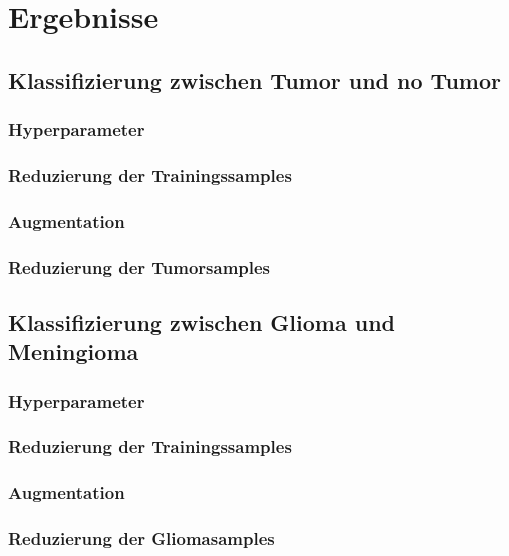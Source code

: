 \chapter{Ergebnisse}

\section{Klassifizierung zwischen Tumor und no Tumor}

\subsection{Hyperparameter}
\subsection{Reduzierung der Trainingssamples}
\subsection{Augmentation}
\subsection{Reduzierung der Tumorsamples}

\section{Klassifizierung zwischen Glioma und Meningioma}

\subsection{Hyperparameter}
\subsection{Reduzierung der Trainingssamples}
\subsection{Augmentation}
\subsection{Reduzierung der Gliomasamples}

